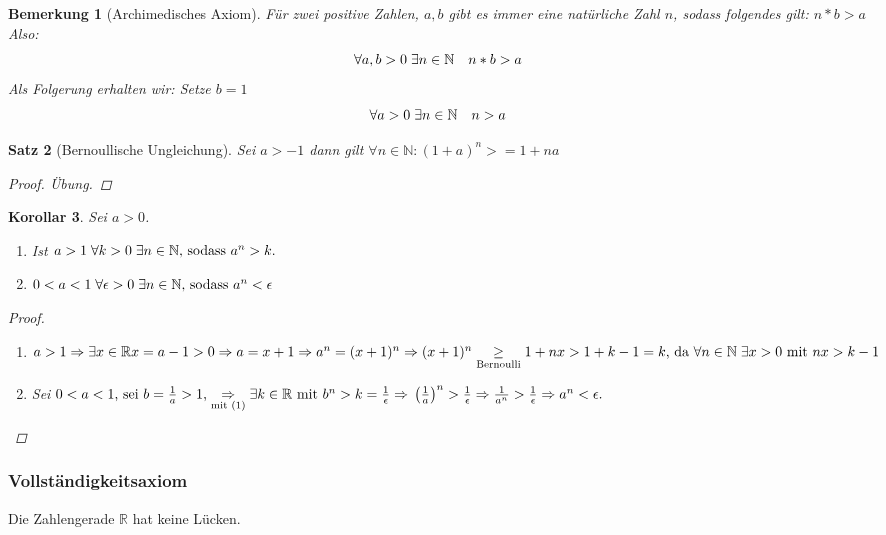 \documentclass[a4paper,titlepage,oneside]{article}
\def\N{\ensuremath{\mathbb{N}} }
\def\R{\ensuremath{\mathbb{R}} }
\newcommand{\fa}[1]{\ensuremath{\forall#1}}
\newcommand{\fain}[2]{\ensuremath{\forall#1\in#2}}
\newcommand{\ex}[1]{\ensuremath{\exists#1}}
\def\sp{\hspace{0,1cm}}
\theoremstyle{thmstyle}
\newtheorem{satz}{Satz}[subsection]
\newtheorem{korr}[satz]{Korollar}
\newtheorem{bem}[satz]{Bemerkung}
\begin{document}
\begin{bem}[Archimedisches Axiom]
Für zwei positive Zahlen, $a, b$ gibt es immer eine natürliche Zahl $n$, sodass folgendes gilt: \(n * b > a\) Also:
\[\fa a,b > 0 \sp \ex n \in \N \quad n * b > a\]
Als Folgerung erhalten wir: Setze $b = 1$
\[\fa a > 0 \sp \ex n \in \N \quad n > a\]
\end{bem}

\begin{satz}[Bernoullische Ungleichung]
Sei $a > -1$ dann gilt $\fain{n}{\N} : (1+a)^n >= 1 + na$
\begin{proof}
Übung.  %
\end{proof}
\end{satz}

\begin{korr}
Sei $a > 0$. 
\begin{enumerate}[label=(\arabic*)]
\item Ist \(a > 1 \sp \forall k > 0 \sp \exists n \in \N \text{, sodass }a^n > k.\)
\item \(0 < a < 1 \sp \forall \epsilon > 0 \sp \exists n \in \N \text{, sodass }a^n < \epsilon\)
\end{enumerate}
\begin{proof}
\sp
\begin{enumerate}[label=(\arabic*)]
\item \( a > 1 \Rightarrow \exists x \in \R x = a - 1 > 0 \Rightarrow a = x +1 \Rightarrow a^n = (x + 1)^n \Rightarrow \\
(x + 1)^n \underset{\text{Bernoulli}}{\ge}1 + nx  > 1 + k -1 = k \text{, da }\forall n \in \N \sp \exists x > 0 \text{ mit } nx > k - 1\)
\item Sei \( 0 < a < 1 \text{, sei } b = \frac{1}{a} > 1\text{,} \underset{\text{mit }(1)}{\Rightarrow} \exists k \in \R \text{ mit } b^n > k = \frac{1}{\epsilon} \Rightarrow \\
\left(\frac{1}{a}\right)^n > \frac{1}{\epsilon} \Rightarrow  \frac{1}{a^n} > \frac{1}{\epsilon} \Rightarrow a^n < \epsilon.\)
\end{enumerate}
\end{proof}
\end{korr}

\subsubsection{Vollständigkeitsaxiom}
Die Zahlengerade \R hat keine Lücken. 
\end{document}
